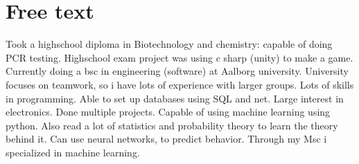 \section*{Free text}
Took a highschool diploma in Biotechnology and chemistry: capable of doing PCR testing.
Highschool exam project was using c sharp (unity) to make a game.
Currently doing a bsc in engineering (software) at Aalborg university.
University focuses on teamwork, so i have lots of experience with larger groups.
Lots of skills in programming.
Able to set up databases using SQL and net.
Large interest in electronics. Done multiple projects.
Capable of using machine learning using python. Also read a lot of statistics and probability theory to learn the theory behind it. Can use neural networks, to predict behavior.
Through my Msc i specialized in machine learning.

